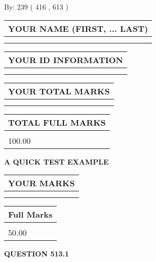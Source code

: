 \documentclass[12pt]{article}
\begin{document}
   
\hspace{1.0in} By: 
 239 ( 416 ,  613 )
   
   
   
   
\newpage 
\setcounter{page}{ 
   513001 } 
   
   
   
   
\noindent\begin{tabular}{|l|}
\hline
YOUR NAME (FIRST, ... LAST)  \\
\hline
 \\ 
 \\ 
\hline
\end{tabular}
\hspace{0.05in} \begin{tabular}{|l|}
\hline
 YOUR   ID   INFORMATION  \\
\hline
 \\ 
 \\ 
\hline
\end{tabular}
   
   
\vspace{0.2in}\noindent\begin{tabular}{|l|}
\hline
YOUR TOTAL MARKS  \\
\hline
 \\ 
 \\ 
\hline
\end{tabular}
\hspace{0.05in} \begin{tabular}{|l|}
\hline
TOTAL FULL MARKS  \\
\hline
 \\ 
100.00 \\
\hline
\end{tabular}
   
   
 \vspace{0.2in}
{\LARGE {\textbf{ A QUICK TEST EXAMPLE}}}
   
   
  
\vspace{0.2in}
  
\noindent\begin{tabular}{|l|}
\hline
 YOUR MARKS  \\
\hline
 \\ 
 \\ 
\hline
\end{tabular}
\hspace{0.05in} \begin{tabular}{|l|}
\hline
 Full Marks  \\
\hline
 \\ 
50.00 \\
\hline
\end{tabular}
{\textbf{\Large{QUESTION
513.1 
}}}
  
\end{document}
